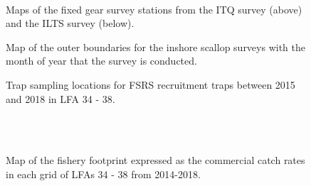 \documentclass[11pt]{article}
\newcommand{\e}{/SpinDr/backup/bio_data/bio.lobster/figures/LFA3438Framework2019/} %
\begin{document}
     \begin{figure}
    \centering
        \\
        \caption{Maps of the fixed gear survey stations from the ITQ survey (above) and the ILTS survey (below).}
    \end{figure}

\begin{figure}
    \centering
        \caption{Map of the outer boundaries for the inshore scallop surveys with the month of year that the survey is conducted.}
    \end{figure}

   \begin{figure}
    \centering
        \caption{Trap sampling locations for FSRS recruitment traps between 2015 and 2018 in LFA 34 - 38.}

    \end{figure}




  \begin{figure}
        \centering
    \\
                \\
        
         \caption{Map of the fishery footprint expressed as the commercial catch rates in each grid of LFAs 34 - 38 from 2014-2018.}
        \end{figure}
\end{document}
